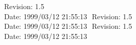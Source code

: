 %
%
%
%
%
%
%
%
%
%
  {\LARGE $ $Revision: 1.5 $ $}  \\[5mm] %
  {\LARGE $ $Date: 1999/03/12 21:55:13 $ $}  %
%
%
%
%
  {\LARGE $ $Revision: 1.5 $ $}  \\[5mm] %
  {\LARGE $ $Date: 1999/03/12 21:55:13 $ $}  %
%
  {\LARGE $ $Revision: 1.5 $ $}  \\[5mm] %
  {\LARGE $ $Date: 1999/03/12 21:55:13 $ $}  %
%
